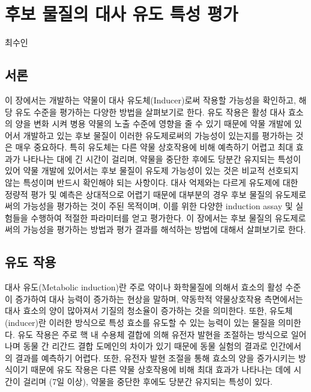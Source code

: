 \documentclass[
  11pt,
  krantz2, a4paper, twoside]{krantz}
\begin{document}
\chapter{후보 물질의 대사 유도 특성 평가}\label{Induction}

\Large\hfill

최수인

\normalsize

\section{서론}\label{uxc11cuxb860-5}

이 장에서는 개발하는 약물이 대사 유도체(Inducer)로써 작용할 가능성을
확인하고, 해당 유도 수준을 평가하는 다양한 방법을 살펴보기로 한다. 유도
작용은 활성 대사 효소의 양을 변화 시켜 병용 약물의 노출 수준에 영향을 줄
수 있기 때문에 약물 개발에 있어서 개발하고 있는 후보 물질이 이러한
유도제로써의 가능성이 있는지를 평가하는 것은 매우 중요하다. 특히
유도체는 다른 약물 상호작용에 비해 예측하기 어렵고 최대 효과가 나타나는
대에 긴 시간이 걸리며, 약물을 중단한 후에도 당분간 유지되는 특성이 있어
약물 개발에 있어서는 후보 물질이 유도제 가능성이 있는 것은 비교적
선호되지 않는 특성이며 반드시 확인해야 되는 사항이다. 대사 억제와는
다르게 유도제에 대한 정량적 평가 및 예측은 상대적으로 어렵기 때문에
대부분의 경우 후보 물질의 유도제로써의 가능성을 평가하는 것이 주된
목적이며, 이를 위한 다양한 induction assay 및 실험들을 수행하여 적절한
파라미터를 얻고 평가한다. 이 장에서는 후보 물질의 유도제로써의 가능성을
평가하는 방법과 평가 결과를 해석하는 방법에 대해서 살펴보기로 한다.

\section{유도 작용}\label{uxc720uxb3c4-uxc791uxc6a9}

대사 유도(Metabolic induction)란 주로 약이나 화학물질에 의해서 효소의
활성 수준이 증가하여 대사 능력이 증가하는 현상을 말하며, 약동학적
약물상호작용 측면에서는 대사 효소의 양이 많아져서 기질의 청소율이
증가하는 것을 의미한다. 또한, 유도체(inducer)란 이러한 방식으로 특성
효소를 유도할 수 있는 능력이 있는 물질을 의미한다. 유도 작용은 주로 핵
내 수용체 결합에 의해 유전자 발현을 조절하는 방식으로 일어나며 동물 간
리간드 결합 도메인의 차이가 있기 때문에 동물 실험의 결과로 인간에서의
결과를 예측하기 어렵다. 또한, 유전자 발현 조절을 통해 효소의 양을
증가시키는 방식이기 때문에 유도 작용은 다른 약물 상호작용에 비해 최대
효과가 나타나는 데에 시간이 걸리며 (7일 이상), 약물을 중단한 후에도
당분간 유지되는 특성이 있다.
\end{document}
